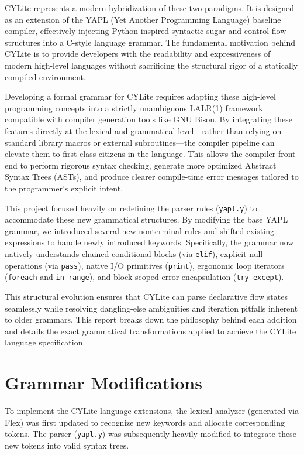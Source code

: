 \documentclass[a4paper,12pt]{article}
\begin{document}
CYLite represents a modern hybridization of these two paradigms. It is designed as an extension of the YAPL (Yet Another Programming Language) baseline compiler, effectively injecting Python-inspired syntactic sugar and control flow structures into a C-style language grammar. The fundamental motivation behind CYLite is to provide developers with the readability and expressiveness of modern high-level languages without sacrificing the structural rigor of a statically compiled environment. 

Developing a formal grammar for CYLite requires adapting these high-level programming concepts into a strictly unambiguous LALR(1) framework compatible with compiler generation tools like GNU Bison. By integrating these features directly at the lexical and grammatical level—rather than relying on standard library macros or external subroutines—the compiler pipeline can elevate them to first-class citizens in the language. This allows the compiler front-end to perform rigorous syntax checking, generate more optimized Abstract Syntax Trees (ASTs), and produce clearer compile-time error messages tailored to the programmer's explicit intent. 

This project focused heavily on redefining the parser rules (\texttt{yapl.y}) to accommodate these new grammatical structures. By modifying the base YAPL grammar, we introduced several new nonterminal rules and shifted existing expressions to handle newly introduced keywords. Specifically, the grammar now natively understands chained conditional blocks (via \texttt{elif}), explicit null operations (via \texttt{pass}), native I/O primitives (\texttt{print}), ergonomic loop iterators (\texttt{foreach} and \texttt{in range}), and block-scoped error encapsulation (\texttt{try-except}). 

This structural evolution ensures that CYLite can parse declarative flow states seamlessly while resolving dangling-else ambiguities and iteration pitfalls inherent to older grammars. This report breaks down the philosophy behind each addition and details the exact grammatical transformations applied to achieve the CYLite language specification.

\singlespacing

\section{Grammar Modifications}

To implement the CYLite language extensions, the lexical analyzer (generated via Flex) was first updated to recognize new keywords and allocate corresponding tokens. The parser (\texttt{yapl.y}) was subsequently heavily modified to integrate these new tokens into valid syntax trees.
\end{document}
